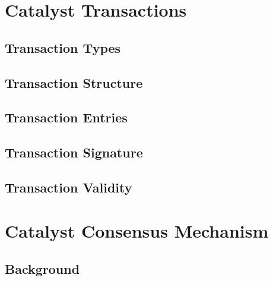 \documentclass[a4paper, 12pt]{book}
\begin{document}
\chapter{Catalyst Transactions} \label{Cha:Tra}




\section{Transaction Types} \label{Sec:Typ}



\section{Transaction Structure} \label{Sec:TStru}




\section{Transaction Entries}\label{Sec:TEnt}



\section{Transaction Signature}\label{Sec:Sig}




\section{Transaction Validity} \label{Sec:Val}





\chapter{Catalyst Consensus Mechanism} \label{Cha:CM}





\section{Background}\label{Sec:Cbg}
\end{document}
